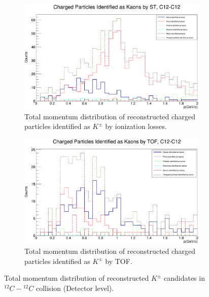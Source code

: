 \documentclass[12pt]{article}
\begin{document}
\begin{figure}[h]
\vspace{1cm}
	\centering
	\begin{subfigure}[h]{0.49\textwidth}
		\centering
		\includegraphics[scale=0.14]{Detector_pToT_kaons(st)_C12.png}
		\caption{Total momentum distribution of reconstructed charged particles identified as $K^{\pm}$ by ionization losses.}
		\label{sim-p-kaons-dedx}
	\end{subfigure}
	\hfill
	\begin{subfigure}[h]{0.49\textwidth}
		\centering
		\includegraphics[scale=0.14]{Detector_pToT_kaons(tof)_C12.png}
		\caption{Total momentum distribution of reconstructed charged particles identified as $K^{\pm}$ by TOF.}
		\label{sim-p-kaons-tof}
	\end{subfigure}
	\caption{Total momentum distribution of reconstructed $K^\pm$ candidates in $^{12}C-{^{12}C}$ collision (Detector level).}
	\label{sim-p-kaons}
\end{figure}
\end{document}
